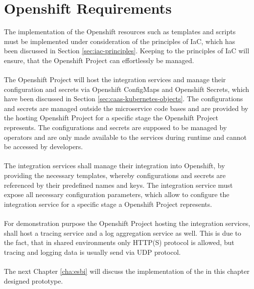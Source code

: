 \section{Openshift Requirements}
\label{sec:esboc-requirements-oc}
The implementation of the Openshift resources such as templates and scripts must be implemented under consideration of the principles of IaC, which has been discussed in Section \vref{sec:iac-principles}. Keeping to the principles of IaC will ensure, that the Openshift Project can effortlessly be managed.   
\\ \\
The Openshift Project will host the integration services and manage their configuration and secrets via Openshift ConfigMaps and Openshift Secrets, which have been discussed in Section \vref{sec:caas-kubernetes-objects}. The configurations and secrets are managed outside the microservice code bases and are provided by the hosting Openshift Project for a specific stage the Openshift Project represents. The configurations and secrets are supposed to be managed by operators and are only made available to the services during runtime and cannot be accessed by developers.
\\ \\
The integration services shall manage their integration into Openshift, by providing the necessary templates, whereby configurations and secrets are referenced by their predefined names and keys. The integration service must expose all necessary configuration parameters, which allow to configure the integration service for a specific stage a Openshift Project represents.
\\ \\
For demonstration purpose the Openshift Project hosting the integration services, shall host a tracing service and a log aggregation service as well. This is due to the fact, that in shared environments only HTTP(S) protocol is allowed, but tracing and logging data is usually send via UDP protocol. 
\\ \\
The next Chapter \vref{cha:esbi} will discuss the implementation of the in this chapter designed prototype. 
